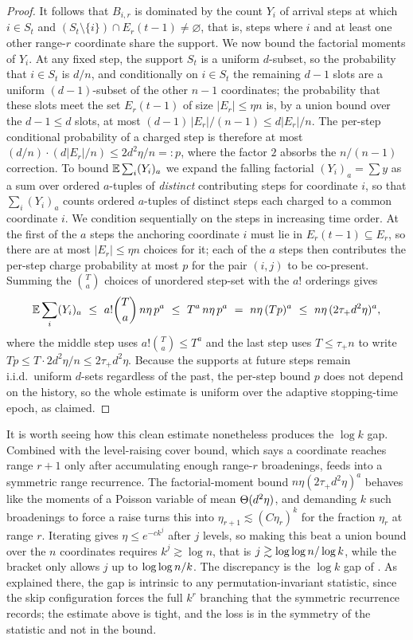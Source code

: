 \begin{proof}
It follows that $B_{i,r}$ is dominated by the count $Y_i$ of arrival steps at which $i\in S_t$ and
$(S_t\setminus\{i\})\cap E_r(t-1)\ne\varnothing$, that is, steps where $i$ and at least one other range-$r$ coordinate share
the support. We now bound the factorial moments of $Y_i$. At any fixed step, the support $S_t$ is a uniform $d$-subset, so
the probability that $i\in S_t$ is $d/n$, and conditionally on $i\in S_t$ the remaining $d-1$ slots are a uniform
$(d-1)$-subset of the other $n-1$ coordinates; the probability that these slots meet the set $E_r(t-1)$ of size
$|E_r|\le\eta n$ is, by a union bound over the $d-1\le d$ slots, at most $(d-1)\,|E_r|/(n-1)\le d|E_r|/n$. The per-step
conditional probability of a charged step is therefore at most $(d/n)\cdot(d|E_r|/n)\le 2d^2\eta/n=:p$, where the factor $2$
absorbs the $n/(n-1)$ correction. To bound $\mathbb{E}\sum_i(Y_i)_a$ we expand the falling factorial
$(Y_i)_a=\sum y$ as a sum over ordered $a$-tuples of \emph{distinct} contributing steps for coordinate $i$, so that
$\sum_i(Y_i)_a$ counts ordered $a$-tuples of distinct steps each charged to a common coordinate $i$. We condition sequentially
on the steps in increasing time order. At the first of the $a$ steps the anchoring coordinate $i$ must lie in
$E_r(t-1)\subseteq E_r$, so there are at most $|E_r|\le\eta n$ choices for it; each of the $a$ steps then contributes the
per-step charge probability at most $p$ for the pair $(i,j)$ to be co-present. Summing the $\binom T a$ choices of unordered
step-set with the $a!$ orderings gives
\[
  \E\sum_i(Y_i)_a\ \le\ a!\binom T a\,n\eta\,p^{a}\ \le\ T^a\,n\eta\,p^{a}\ =\ n\eta\,(Tp)^{a}\ \le\ n\eta\,(2\tau_+ d^2\eta)^{a},
\]
where the middle step uses $a!\binom T a\le T^a$ and the last step uses $T\le\tau_+ n$ to write
$Tp\le T\cdot 2d^2\eta/n\le 2\tau_+ d^2\eta$. Because the supports at future steps remain i.i.d.\ uniform $d$-sets
regardless of the past, the per-step bound $p$ does not depend on the history, so the whole estimate is uniform over the
adaptive stopping-time epoch, as claimed.
\end{proof}

It is worth seeing how this clean estimate nonetheless produces the $\log k$ gap. Combined with the level-raising cover
bound, which says a coordinate reaches range $r+1$ only after accumulating enough range-$r$ broadenings,  feeds
into a symmetric range recurrence. The factorial-moment bound $n\eta(2\tau_+d^2\eta)^a$ behaves like the moments of a Poisson
variable of mean $\Theta(d^2\eta)$, and demanding $k$ such broadenings to force a raise turns this into
$\eta_{r+1}\lesssim(C\eta_r)^k$ for the fraction $\eta_r$ at range $r$. Iterating gives $\eta\le e^{-ck^{j}}$ after $j$
levels, so making this beat a union bound over the $n$ coordinates requires $k^{j}\gtrsim\log n$, that is
$j\gtrsim\log\log n/\log k$, while the bracket only allows $j$ up to $\log\log n/k$. The discrepancy is the $\log k$ gap of
. As explained there, the gap is intrinsic to any permutation-invariant statistic, since the skip
configuration forces the full $k^{r}$ branching that the symmetric recurrence records; the estimate above is tight, and the
loss is in the symmetry of the statistic and not in the bound.

